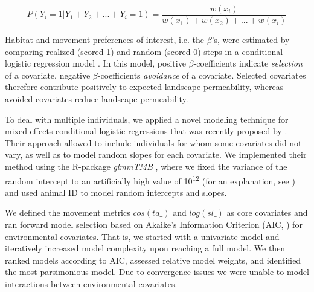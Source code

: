 \documentclass[abstract=on,10pt,a4paper,bibliography=totocnumbered]{scrartcl}
\begin{document}
\begin{equation}
\label{EQ3}
  P(Y_{i} = 1 | Y_{1} + Y_{2} + ... + Y_{i} = 1) =
  \frac{w(x_{i})}{w(x_{1}) + w(x_{2}) + ... + w(x_{i})}
\end{equation}

\noindent Habitat and movement preferences of interest, i.e. the \(\beta\)'s,
were estimated by comparing realized (scored 1) and random (scored 0) steps in a
conditional logistic regression model \citep{Fortin.2005}. In this model,
positive \(\beta\)-coefficients indicate \textit{selection} of a covariate,
negative \(\beta\)-coefficients \textit{avoidance} of a covariate. Selected
covariates therefore contribute positively to expected landscape permeability,
whereas avoided covariates reduce landscape permeability.

To deal with multiple individuals, we applied a novel modeling technique for
mixed effects conditional logistic regressions that was recently proposed by
\cite{Muff.2019}. Their approach allowed to include individuals for whom some
covariates did not vary, as well as to model random slopes for each covariate.
We implemented their method using the R-package \textit{glmmTMB}
\citep{Mollie.2017}, where we fixed the variance of the random intercept to an
artificially high value of 10\textsuperscript{12} (for an explanation, see
\cite{Muff.2019}) and used animal ID to model random intercepts and slopes.

We defined the movement metrics \(cos(ta\_)\) and \(log(sl\_)\) as core
covariates and ran forward model selection based on Akaike's Information
Criterion (AIC, \cite{Burnham.2002}) for environmental covariates. That is, we
started with a univariate model and iteratively increased model complexity upon
reaching a full model. We then ranked models according to AIC, assessed relative
model weights, and identified the most parsimonious model. Due to convergence
issues we were unable to model interactions between environmental covariates.
\end{document}
